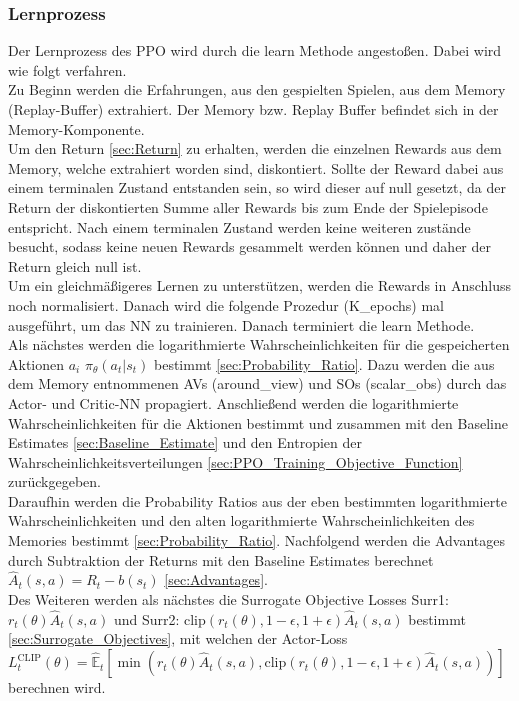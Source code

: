 \subsubsection{Lernprozess} \label{sec:Konzept_Lernprozess_PPO}
Der Lernprozess des PPO wird durch die learn Methode angestoßen. Dabei wird wie folgt verfahren.\\
Zu Beginn werden die Erfahrungen, aus den gespielten Spielen, aus dem Memory (Replay-Buffer) extrahiert. Der Memory bzw. Replay Buffer befindet sich in der Memory-Komponente.\\
Um den Return \ref{sec:Return} zu erhalten, werden die einzelnen Rewards aus dem Memory, welche extrahiert worden sind, diskontiert. Sollte der Reward dabei aus einem terminalen Zustand entstanden sein, so wird dieser auf null gesetzt, da der Return der diskontierten Summe aller Rewards bis zum Ende der Spielepisode entspricht. Nach einem terminalen Zustand werden keine weiteren zustände besucht, sodass keine neuen Rewards gesammelt werden können und daher der Return gleich null ist.\\
Um ein gleichmäßigeres Lernen zu unterstützen, werden die Rewards in Anschluss noch normalisiert.
Danach wird die folgende Prozedur (K\_epochs) mal ausgeführt, um das NN zu trainieren. Danach terminiert die learn Methode.\\
Als nächstes werden die logarithmierte Wahrscheinlichkeiten für die gespeicherten Aktionen $a_i$ $\pi_{\theta}(a_{t}|s_{t})$ bestimmt \ref{sec:Probability_Ratio}. Dazu werden die aus dem Memory entnommenen AVs (around\_view) und SOs (scalar\_obs) durch das Actor- und Critic-NN propagiert. Anschließend werden die logarithmierte Wahrscheinlichkeiten für die Aktionen bestimmt und zusammen mit den Baseline Estimates \ref{sec:Baseline_Estimate} und den Entropien der Wahrscheinlichkeitsverteilungen \ref{sec:PPO_Training_Objective_Function} zurückgegeben.\\
Daraufhin werden die Probability Ratios aus der eben bestimmten logarithmierte Wahrscheinlichkeiten und den alten logarithmierte Wahrscheinlichkeiten des Memories bestimmt \ref{sec:Probability_Ratio}.
Nachfolgend werden die Advantages durch Subtraktion der Returns mit den Baseline Estimates berechnet $\hat{A}_{t}(s, a) = R_{t} - b(s_{t})$ \ref{sec:Advantages}.\\
Des Weiteren werden als nächstes die Surrogate Objective Losses Surr1: $r_{t}(\theta) \hat{A}_{t}(s, a)$ und Surr2: $\text{clip}(r_{t}(\theta), 1 - \epsilon, 1 + \epsilon) \hat{A}_{t}(s, a)$ bestimmt \ref{sec:Surrogate_Objectives}, mit welchen der Actor-Loss $L^\text{CLIP}_{t} (\theta) = \mathbb{\hat{E}}_{t} [ \min(r_{t}(\theta) \hat{A}_{t}(s, a), \text{clip}(r_{t}(\theta), 1 - \epsilon, 1 + \epsilon) \hat{A}_{t}(s, a))]$ berechnen wird.
